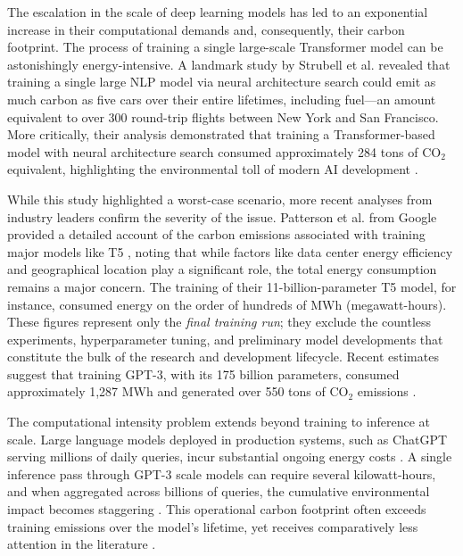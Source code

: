 \documentclass[12pt, a4paper]{article}
\begin{document}
The escalation in the scale of deep learning models has led to an exponential increase in their computational demands and, consequently, their carbon footprint. The process of training a single large-scale Transformer model can be astonishingly energy-intensive. A landmark study by Strubell et al. \cite{strubell2019energy} revealed that training a single large NLP model via neural architecture search could emit as much carbon as five cars over their entire lifetimes, including fuel---an amount equivalent to over 300 round-trip flights between New York and San Francisco. More critically, their analysis demonstrated that training a Transformer-based model with neural architecture search consumed approximately 284 tons of CO$_2$ equivalent, highlighting the environmental toll of modern AI development \cite{bender2021dangers}.

While this study highlighted a worst-case scenario, more recent analyses from industry leaders confirm the severity of the issue. Patterson et al. \cite{patterson2021carbon} from Google provided a detailed account of the carbon emissions associated with training major models like T5 \cite{raffel2020exploring}, noting that while factors like data center energy efficiency and geographical location play a significant role, the total energy consumption remains a major concern. The training of their 11-billion-parameter T5 model, for instance, consumed energy on the order of hundreds of MWh (megawatt-hours). These figures represent only the \textit{final training run}; they exclude the countless experiments, hyperparameter tuning, and preliminary model developments that constitute the bulk of the research and development lifecycle. Recent estimates suggest that training GPT-3, with its 175 billion parameters, consumed approximately 1,287 MWh and generated over 550 tons of CO$_2$ emissions \cite{luccioni2022estimating}.

The computational intensity problem extends beyond training to inference at scale. Large language models deployed in production systems, such as ChatGPT serving millions of daily queries, incur substantial ongoing energy costs \cite{wu2022sustainable}. A single inference pass through GPT-3 scale models can require several kilowatt-hours, and when aggregated across billions of queries, the cumulative environmental impact becomes staggering \cite{dodge2022measuring}. This operational carbon footprint often exceeds training emissions over the model's lifetime, yet receives comparatively less attention in the literature \cite{gupta2022chasing}.
\end{document}
